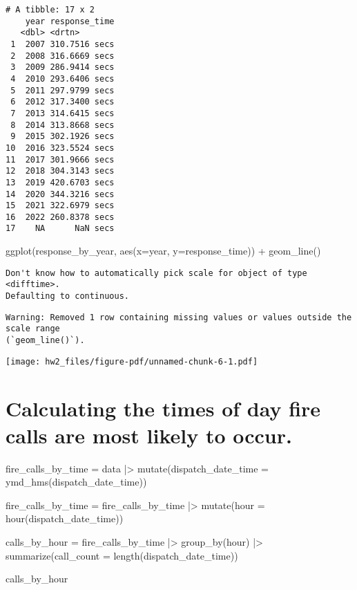 \documentclass[
  letterpaper,
  DIV=11,
  numbers=noendperiod]{scrartcl}
\newenvironment{Shaded}{\begin{snugshade}}{\end{snugshade}}
\newcommand{\AttributeTok}[1]{\textcolor[rgb]{0.40,0.45,0.13}{#1}}
\newcommand{\FunctionTok}[1]{\textcolor[rgb]{0.28,0.35,0.67}{#1}}
\newcommand{\NormalTok}[1]{\textcolor[rgb]{0.00,0.23,0.31}{#1}}
\newcommand{\OtherTok}[1]{\textcolor[rgb]{0.00,0.23,0.31}{#1}}
\newcommand{\SpecialCharTok}[1]{\textcolor[rgb]{0.37,0.37,0.37}{#1}}
\begin{document}
\begin{verbatim}
# A tibble: 17 x 2
    year response_time
   <dbl> <drtn>       
 1  2007 310.7516 secs
 2  2008 316.6669 secs
 3  2009 286.9414 secs
 4  2010 293.6406 secs
 5  2011 297.9799 secs
 6  2012 317.3400 secs
 7  2013 314.6415 secs
 8  2014 313.8668 secs
 9  2015 302.1926 secs
10  2016 323.5524 secs
11  2017 301.9666 secs
12  2018 304.3143 secs
13  2019 420.6703 secs
14  2020 344.3216 secs
15  2021 322.6979 secs
16  2022 260.8378 secs
17    NA      NaN secs
\end{verbatim}

\begin{Shaded}
\begin{Highlighting}[]
\FunctionTok{ggplot}\NormalTok{(response\_by\_year, }\FunctionTok{aes}\NormalTok{(}\AttributeTok{x=}\NormalTok{year, }\AttributeTok{y=}\NormalTok{response\_time)) }\SpecialCharTok{+}
  \FunctionTok{geom\_line}\NormalTok{() }
\end{Highlighting}
\end{Shaded}

\begin{verbatim}
Don't know how to automatically pick scale for object of type <difftime>.
Defaulting to continuous.
\end{verbatim}

\begin{verbatim}
Warning: Removed 1 row containing missing values or values outside the scale range
(`geom_line()`).
\end{verbatim}

\texttt{[image: hw2\_files/figure-pdf/unnamed-chunk-6-1.pdf]}

\section{Calculating the times of day fire calls are most likely to
occur.}\label{calculating-the-times-of-day-fire-calls-are-most-likely-to-occur.}

\begin{Shaded}
\begin{Highlighting}[]
\NormalTok{fire\_calls\_by\_time }\OtherTok{=}\NormalTok{ data }\SpecialCharTok{|\textgreater{}}
  \FunctionTok{mutate}\NormalTok{(}\AttributeTok{dispatch\_date\_time =} \FunctionTok{ymd\_hms}\NormalTok{(dispatch\_date\_time))}

\NormalTok{fire\_calls\_by\_time }\OtherTok{=}\NormalTok{ fire\_calls\_by\_time }\SpecialCharTok{|\textgreater{}}
  \FunctionTok{mutate}\NormalTok{(}\AttributeTok{hour =} \FunctionTok{hour}\NormalTok{(dispatch\_date\_time))}

\NormalTok{calls\_by\_hour }\OtherTok{=}\NormalTok{ fire\_calls\_by\_time }\SpecialCharTok{|\textgreater{}}
\FunctionTok{group\_by}\NormalTok{(hour) }\SpecialCharTok{|\textgreater{}}
  \FunctionTok{summarize}\NormalTok{(}\AttributeTok{call\_count =} \FunctionTok{length}\NormalTok{(dispatch\_date\_time)) }

\NormalTok{calls\_by\_hour}
\end{Highlighting}
\end{Shaded}
\end{document}
